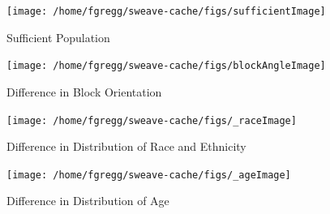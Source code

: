 \documentclass[12pt,letter]{article}\usepackage[]{graphicx}\usepackage[]{color}
\newenvironment{knitrout}{}{} %
\begin{document}
\begin{figure}
\begin{knitrout}
\color{fgcolor}

{\centering \texttt{[image: /home/fgregg/sweave-cache/figs/sufficientImage]} 

}



\end{knitrout}

\caption{Sufficient Population}
\end{figure}


\begin{figure}
\begin{knitrout}
\color{fgcolor}

{\centering \texttt{[image: /home/fgregg/sweave-cache/figs/blockAngleImage]} 

}



\end{knitrout}

\caption{Difference in Block Orientation}
\end{figure}

\begin{figure}
\begin{knitrout}
\color{fgcolor}

{\centering \texttt{[image: /home/fgregg/sweave-cache/figs/\_raceImage]} 

}



\end{knitrout}

\caption{Difference in Distribution of Race and Ethnicity}
\end{figure}


\begin{figure}
\begin{knitrout}
\color{fgcolor}

{\centering \texttt{[image: /home/fgregg/sweave-cache/figs/\_ageImage]} 

}



\end{knitrout}

\caption{Difference in Distribution of Age}
\end{figure}
\end{document}
